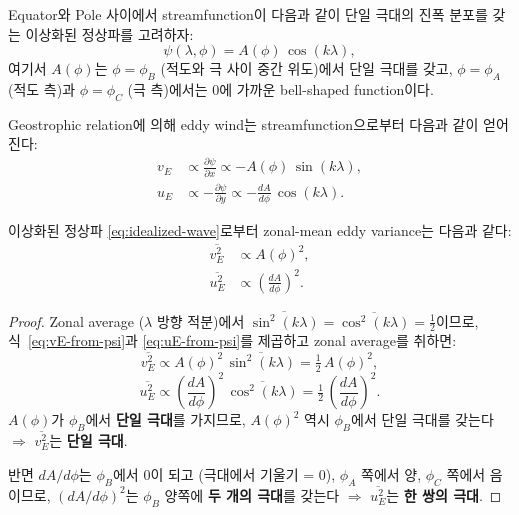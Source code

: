 \begin{definition}
Equator와 Pole 사이에서 streamfunction이 다음과 같이 단일 극대의 진폭 분포를 갖는
이상화된 정상파를 고려하자:
\begin{equation}
  \psi(\lambda, \phi) = A(\phi)\,\cos(k\lambda),
  \label{eq:idealized-wave}
\end{equation}
여기서 $A(\phi)$는 $\phi = \phi_{B}$ (적도와 극 사이 중간 위도)에서 단일 극대를 갖고,
$\phi = \phi_{A}$ (적도 측)과 $\phi = \phi_{C}$ (극 측)에서는 0에 가까운 bell-shaped function이다.
\end{definition}

\begin{remark}
Geostrophic relation에 의해 eddy wind는 streamfunction으로부터 다음과 같이 얻어진다:
\begin{align}
  v_{E} &\propto \frac{\partial \psi}{\partial x}
         \propto -A(\phi)\,\sin(k\lambda),
  \label{eq:vE-from-psi} \\
  u_{E} &\propto -\frac{\partial \psi}{\partial y}
         \propto -\frac{dA}{d\phi}\,\cos(k\lambda).
  \label{eq:uE-from-psi}
\end{align}
\end{remark}

\begin{theorem}
\label{thm:eddy-variance}
이상화된 정상파 \eqref{eq:idealized-wave}로부터 zonal-mean eddy variance는 다음과 같다:
\begin{align}
  \overline{v_{E}^{2}} &\propto A(\phi)^{2},
  \label{eq:vE2-structure} \\
  \overline{u_{E}^{2}} &\propto \left(\frac{dA}{d\phi}\right)^{2}.
  \label{eq:uE2-structure}
\end{align}
\end{theorem}

\begin{proof}
Zonal average ($\lambda$ 방향 적분)에서
$\overline{\sin^{2}(k\lambda)} = \overline{\cos^{2}(k\lambda)} = \frac{1}{2}$이므로,
식~\eqref{eq:vE-from-psi}과 \eqref{eq:uE-from-psi}를 제곱하고 zonal average를 취하면:
\[
  \overline{v_{E}^{2}} \propto A(\phi)^{2}\,\overline{\sin^{2}(k\lambda)}
                        = \tfrac{1}{2}\,A(\phi)^{2},
\]
\[
  \overline{u_{E}^{2}} \propto \left(\frac{dA}{d\phi}\right)^{2}\,\overline{\cos^{2}(k\lambda)}
                        = \tfrac{1}{2}\,\left(\frac{dA}{d\phi}\right)^{2}.
\]
$A(\phi)$가 $\phi_{B}$에서 \textbf{단일 극대}를 가지므로,
$A(\phi)^{2}$ 역시 $\phi_{B}$에서 단일 극대를 갖는다 $\Rightarrow$ $\overline{v_{E}^{2}}$는 \textbf{단일 극대}.

반면 $dA/d\phi$는 $\phi_{B}$에서 0이 되고 (극대에서 기울기 = 0),
$\phi_{A}$ 쪽에서 양, $\phi_{C}$ 쪽에서 음이므로,
$(dA/d\phi)^{2}$는 $\phi_{B}$ 양쪽에 \textbf{두 개의 극대}를 갖는다
$\Rightarrow$ $\overline{u_{E}^{2}}$는 \textbf{한 쌍의 극대}.
\end{proof}


